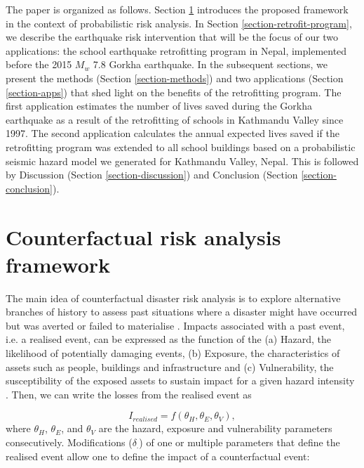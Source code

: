 \documentclass[utf8]{frontiersSCNS} %
\begin{document}
The paper is organized as follows. Section \ref{section-counter} introduces the proposed framework in the context of probabilistic risk analysis. In Section \ref{section-retrofit-program}, we describe the earthquake risk intervention that will be the focus of our two applications: the school earthquake retrofitting program in Nepal, implemented before the 2015 $M_{w}$ 7.8 Gorkha earthquake. In the subsequent sections, we present the methods (Section \ref{section-methods}) and two applications (Section \ref{section-apps}) that shed light on the benefits of the retrofitting program. The first application estimates the number of lives saved during the Gorkha earthquake as a result of the retrofitting of schools in Kathmandu Valley since 1997. The second application calculates the annual expected lives saved if the retrofitting program was extended to all school buildings based on a probabilistic seismic hazard model we generated for Kathmandu Valley, Nepal. This is followed by Discussion (Section \ref{section-discussion}) and Conclusion (Section \ref{section-conclusion}).

\section{Counterfactual risk analysis framework}
\label{section-counter}

The main idea of counterfactual disaster risk analysis is to explore alternative branches of history to assess past situations where a disaster might have occurred but was averted or failed to materialise \citep{woo2018counterfactualvar}. Impacts associated with a past event, i.e. a realised event, can be expressed as the function of the (a) Hazard, the likelihood of potentially damaging events, (b) Exposure, the characteristics of assets such as people, buildings and infrastructure and (c) Vulnerability, the susceptibility of the exposed assets to sustain impact for a given hazard intensity \citep{UNISDRterms2009}. Then, we can write the losses from the realised event as 

\begin{equation}\label{eq:realised}
        I_{realised} = f \left( \theta_H, \theta_E, \theta_V \right),
    \end{equation}
where $\theta_H$, $\theta_E$, and $\theta_V$ are the hazard, exposure and vulnerability parameters consecutively. Modifications ($\delta_.$) of one or multiple parameters that define the realised event allow one to define the impact of a counterfactual event:
\end{document}
